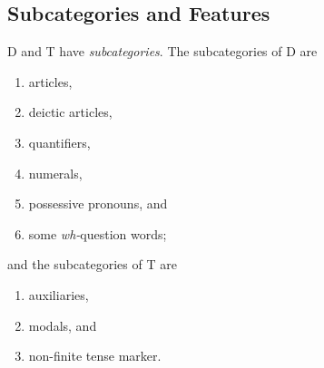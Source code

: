 \subsection{Subcategories and Features}

D and T have \emph{subcategories}. The subcategories of D are
\begin{enumerate}
  \item articles,
  \item deictic articles,
  \item quantifiers,
  \item numerals,
  \item possessive pronouns, and
  \item some \textit{wh-}question words;
\end{enumerate}
and the subcategories of T are
\begin{enumerate}
  \item auxiliaries,
  \item modals, and
  \item non-finite tense marker.
\end{enumerate}

\Edc
